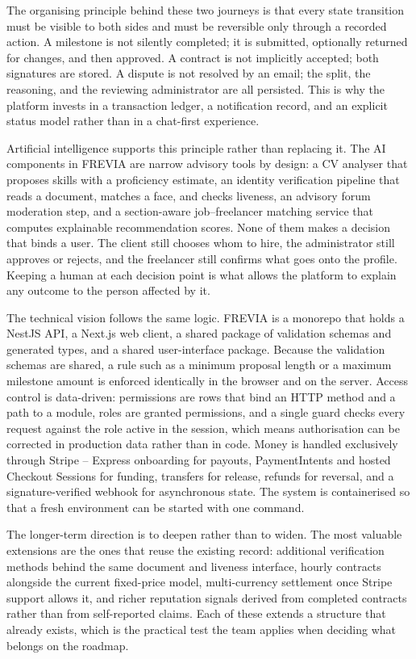 The organising principle behind these two journeys is that every state transition must be visible to both sides and must be reversible only through a recorded action. A milestone is not silently completed; it is submitted, optionally returned for changes, and then approved. A contract is not implicitly accepted; both signatures are stored. A dispute is not resolved by an email; the split, the reasoning, and the reviewing administrator are all persisted. This is why the platform invests in a transaction ledger, a notification record, and an explicit status model rather than in a chat-first experience.

Artificial intelligence supports this principle rather than replacing it. The AI components in FREVIA are narrow advisory tools by design: a CV analyser that proposes skills with a proficiency estimate, an identity verification pipeline that reads a document, matches a face, and checks liveness, an advisory forum moderation step, and a section-aware job--freelancer matching service that computes explainable recommendation scores. None of them makes a decision that binds a user. The client still chooses whom to hire, the administrator still approves or rejects, and the freelancer still confirms what goes onto the profile. Keeping a human at each decision point is what allows the platform to explain any outcome to the person affected by it.

The technical vision follows the same logic. FREVIA is a monorepo that holds a NestJS API, a Next.js web client, a shared package of validation schemas and generated types, and a shared user-interface package. Because the validation schemas are shared, a rule such as a minimum proposal length or a maximum milestone amount is enforced identically in the browser and on the server. Access control is data-driven: permissions are rows that bind an HTTP method and a path to a module, roles are granted permissions, and a single guard checks every request against the role active in the session, which means authorisation can be corrected in production data rather than in code. Money is handled exclusively through Stripe -- Express onboarding for payouts, PaymentIntents and hosted Checkout Sessions for funding, transfers for release, refunds for reversal, and a signature-verified webhook for asynchronous state. The system is containerised so that a fresh environment can be started with one command.

The longer-term direction is to deepen rather than to widen. The most valuable extensions are the ones that reuse the existing record: additional verification methods behind the same document and liveness interface, hourly contracts alongside the current fixed-price model, multi-currency settlement once Stripe support allows it, and richer reputation signals derived from completed contracts rather than from self-reported claims. Each of these extends a structure that already exists, which is the practical test the team applies when deciding what belongs on the roadmap.

